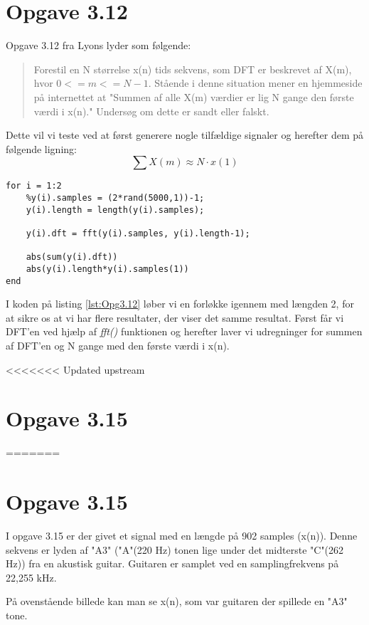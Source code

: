 \documentclass[../main.tex]{subfiles}
\begin{document}
\section{Opgave 3.12}
Opgave 3.12 fra Lyons lyder som følgende:
\begin{quote}
    Forestil en N størrelse x(n) tids sekvens, som DFT er beskrevet af X(m), hvor $0 <= m <= N-1$. 
    Stående i denne situation mener en hjemmeside på internettet at "Summen af alle X(m) værdier er lig N gange den første værdi i x(n)." 
    Undersøg om dette er sandt eller falskt.
\end{quote}

Dette vil vi teste ved at først generere nogle tilfældige signaler og herefter dem på følgende ligning:
\[
    \sum X(m) \approx N \cdot x(1)    
\]

\begin{lstlisting}[caption=MatLab kode til udregning af problematikken fra 3.12, label=lst:Opg3.12]
for i = 1:2
    %y(i).samples = (2*rand(5000,1))-1;
    y(i).length = length(y(i).samples);
    
    y(i).dft = fft(y(i).samples, y(i).length-1);
    
    abs(sum(y(i).dft))
    abs(y(i).length*y(i).samples(1))
end    
\end{lstlisting}

I koden på listing \ref{lst:Opg3.12} løber vi en forløkke igennem med længden 2, for at sikre os at vi har flere resultater, der viser det samme resultat.
Først får vi DFT'en ved hjælp af \textit{fft()} funktionen og herefter laver vi udregninger for summen af DFT'en og N gange med den første værdi i x(n).

<<<<<<< Updated upstream

\section{Opgave 3.15}
=======
\section{Opgave 3.15}
I opgave 3.15 er der givet et signal med en længde på 902 samples (x(n)). Denne sekvens er lyden af "A3" ("A"(220 Hz) tonen lige under det midterste "C"(262 Hz)) fra en akustisk guitar. 
Guitaren er samplet ved en samplingfrekvens på 22,255 kHz.

På ovenstående billede kan man se x(n), som var guitaren der spillede en "A3" tone.
\end{document}
